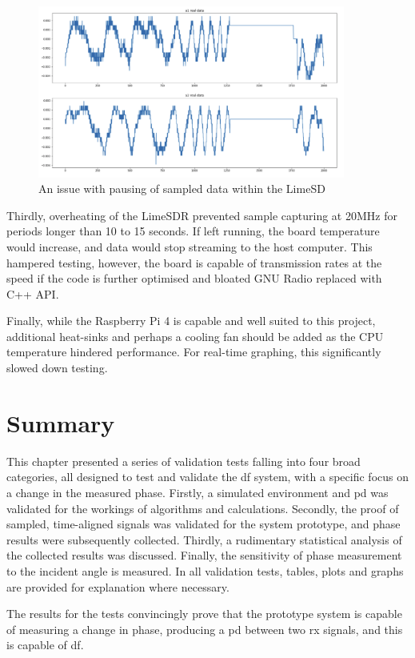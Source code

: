 \documentclass[class=report,11pt,crop=false]{standalone}
\begin{document}
\begin{figure}[h]
    \centering
    \includegraphics[width=0.9\textwidth]{Images/plots/weirdclipping.png}
    \caption{An issue with pausing of sampled data within the LimeSD}
    \label{fig:lime-clipping}
\end{figure}

Thirdly, overheating of the LimeSDR prevented sample capturing at 20MHz for periods longer than 10 to 15 seconds. If left running, the board temperature would increase, and data would stop streaming to the host computer. This hampered testing, however, the board is capable of transmission rates at the speed if the code is further optimised and bloated GNU Radio replaced with C++ \gls{API}.

Finally, while the Raspberry Pi 4 is capable and well suited to this project, additional heat-sinks and perhaps a cooling fan should be added as the CPU temperature hindered performance. For real-time graphing, this significantly slowed down testing. 


\section{Summary}
This chapter presented a series of validation tests falling into four broad categories, all designed to test and validate the \gls{df} system, with a specific focus on a change in the measured phase. Firstly, a simulated environment and \gls{pd} was validated for the workings of algorithms and calculations. Secondly, the proof of sampled, time-aligned signals was validated for the system prototype, and phase results were subsequently collected. Thirdly, a rudimentary statistical analysis of the collected results was discussed. Finally, the sensitivity of phase measurement to the incident angle is measured. In all validation tests, tables, plots and graphs are provided for explanation where necessary. 

The results for the tests convincingly prove that the prototype system is capable of measuring a change in phase, producing a \gls{pd} between two \gls{rx} signals, and this is capable of \gls{df}. 

\ifstandalone

\printnoidxglossary[type=\acronymtype,nonumberlist]
\fi
\end{document}
